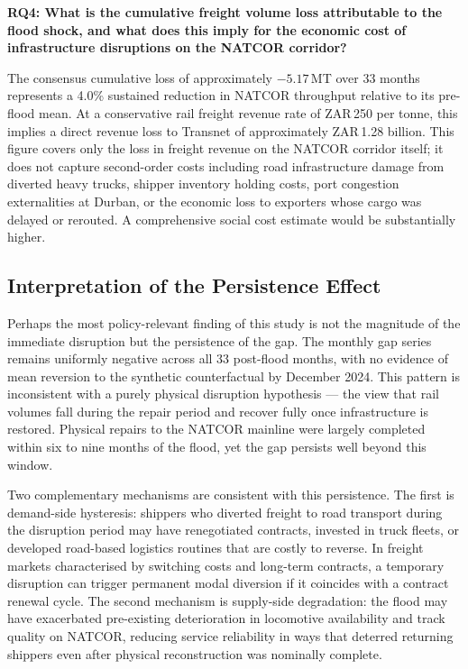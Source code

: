 \textbf{RQ4: What is the cumulative freight volume loss attributable
to the flood shock, and what does this imply for the economic cost
of infrastructure disruptions on the NATCOR corridor?}

The consensus cumulative loss of approximately $-5.17$\,MT over 33
months represents a 4.0\% sustained reduction in NATCOR throughput
relative to its pre-flood mean.
At a conservative rail freight revenue rate of ZAR\,250 per tonne,
this implies a direct revenue loss to Transnet of approximately
ZAR\,1.28 billion.
This figure covers only the loss in freight revenue on the NATCOR
corridor itself; it does not capture second-order costs including
road infrastructure damage from diverted heavy trucks, shipper
inventory holding costs, port congestion externalities at Durban,
or the economic loss to exporters whose cargo was delayed or rerouted.
A comprehensive social cost estimate would be substantially higher.

\subsection{Interpretation of the Persistence Effect}
\label{sec:disc_persist}

Perhaps the most policy-relevant finding of this study is not the
magnitude of the immediate disruption but the persistence of the
gap.
The monthly gap series remains uniformly negative across all 33
post-flood months, with no evidence of mean reversion to the
synthetic counterfactual by December 2024.
This pattern is inconsistent with a purely physical disruption
hypothesis --- the view that rail volumes fall during the repair
period and recover fully once infrastructure is restored.
Physical repairs to the NATCOR mainline were largely completed
within six to nine months of the flood, yet the gap persists well
beyond this window.

Two complementary mechanisms are consistent with this persistence.
The first is demand-side hysteresis: shippers who diverted freight
to road transport during the disruption period may have renegotiated
contracts, invested in truck fleets, or developed road-based
logistics routines that are costly to reverse.
In freight markets characterised by switching costs and long-term
contracts, a temporary disruption can trigger permanent modal
diversion if it coincides with a contract renewal cycle.
The second mechanism is supply-side degradation: the flood may
have exacerbated pre-existing deterioration in locomotive
availability and track quality on NATCOR, reducing service
reliability in ways that deterred returning shippers even after
physical reconstruction was nominally complete.

